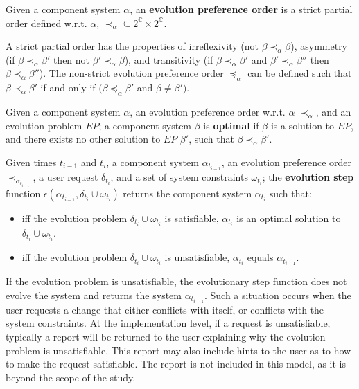 \begin{defs}
Given a component system $\alpha$, an \textbf{evolution preference order} is a strict partial order defined w.r.t. $\alpha$,  $\prec_{\alpha} \subseteq 2^{\mathbb{C}} \times 2^{\mathbb{C}}$.
\end{defs}
A strict partial order has the properties of irreflexivity (not $\beta \prec_{\alpha} \beta$), asymmetry (if $\beta \prec_{\alpha} \beta'$ then not $\beta' \prec_{\alpha} \beta$), 
and transitivity (if $\beta \prec_{\alpha} \beta'$ and $\beta' \prec_{\alpha} \beta''$ then $\beta \prec_{\alpha} \beta''$).
The non-strict evolution preference order $\preceq_{\alpha}$ can be defined such that $\beta \prec_{\alpha} \beta'$ if and only if $(\beta \preceq_{\alpha} \beta'$ and $\beta \neq \beta')$. 

\begin{defs}
Given a component system $\alpha$, an evolution preference order w.r.t. $\alpha$ $\prec_{\alpha}$, and an evolution problem $EP$;
a component system $\beta$ is \textbf{optimal} if $\beta$ is a solution to $EP$, and there exists no other solution to $EP$ $\beta'$, such that $\beta \prec_{\alpha} \beta'$.   
\end{defs}

\begin{defs}
\label{formal.stepdef}
Given times $t_{i-1}$ and $t_i$, a component system $\alpha_{t_{i-1}}$, an evolution preference order $\prec_{\alpha_{t_{i-1}}}$, 
a user request $\delta_{t_i}$, and a set of system constraints $\omega_{t_i}$;
the \textbf{evolution step} function  $\epsilon(\alpha_{t_{i-1}},\delta_{t_i} \cup \omega_{t_i})$ returns the component system $\alpha_{t_i}$ such that:
\begin{itemize}
  \item iff the evolution problem $\delta_{t_i} \cup \omega_{t_i}$ is satisfiable, $\alpha_{t_i}$ is an optimal solution to $\delta_{t_i} \cup \omega_{t_i}$.
  \item iff the evolution problem $\delta_{t_i} \cup \omega_{t_i}$ is unsatisfiable, $\alpha_{t_i}$ equals $\alpha_{t_{i-1}}$.
\end{itemize}
\end{defs}
If the evolution problem is unsatisfiable, the evolutionary step function does not evolve the system and returns the system $\alpha_{t_{i-1}}$.
Such a situation occurs when the user requests a change that either conflicts with itself, or conflicts with the system constraints.
At the implementation level, if a request is unsatisfiable, typically a report will be returned to the user explaining why the evolution problem is unsatisfiable.
This report may also include hints to the user as to how to make the request satisfiable.
The report is not included in this model, as it is beyond the scope of the study.


